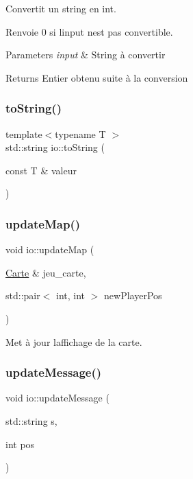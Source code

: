 Convertit un string en int. 

Renvoie 0 si l\textquotesingle{}input n\textquotesingle{}est pas convertible. 
\begin{DoxyParams}{Parameters}
{\em input} & String à convertir \\
\hline
\end{DoxyParams}
\begin{DoxyReturn}{Returns}
Entier obtenu suite à la conversion 
\end{DoxyReturn}
\mbox{\label{namespaceio_adfc4ec23f63d0f743773a584f0a5826f}} 
\subsubsection{\texorpdfstring{to\+String()}{toString()}}
{\footnotesize\ttfamily template$<$typename T $>$ \\
std\+::string io\+::to\+String (\begin{DoxyParamCaption}\item[{const T \&}]{valeur }\end{DoxyParamCaption})}

\mbox{\label{namespaceio_ae9438bfe8b2631be82b0f4d644358545}} 
\subsubsection{\texorpdfstring{update\+Map()}{updateMap()}}
{\footnotesize\ttfamily void io\+::update\+Map (\begin{DoxyParamCaption}\item[{\hyperlink{class_carte}{Carte} \&}]{jeu\+\_\+carte,  }\item[{std\+::pair$<$ int, int $>$}]{new\+Player\+Pos }\end{DoxyParamCaption})}



Met à jour l\textquotesingle{}affichage de la carte. 

\mbox{\label{namespaceio_a61739b6fe40275cdb72215fd08f41d87}} 
\subsubsection{\texorpdfstring{update\+Message()}{updateMessage()}}
{\footnotesize\ttfamily void io\+::update\+Message (\begin{DoxyParamCaption}\item[{std\+::string}]{s,  }\item[{int}]{pos }\end{DoxyParamCaption})}



